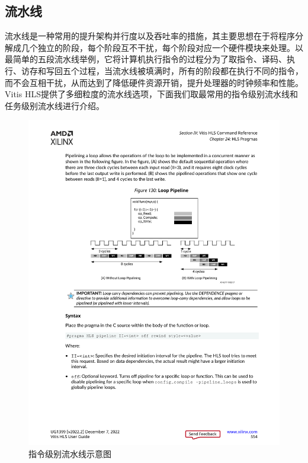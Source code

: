 \subsection{流水线}

流水线是一种常用的提升架构并行度以及吞吐率的措施，其主要思想在于将程序分解成几个独立的阶段，每个阶段互不干扰，每个阶段对应一个硬件模块来处理。以最简单的五段流水线举例，它将计算机执行指令的过程分为了取指令、译码、执行、访存和写回五个过程，当流水线被填满时，所有的阶段都在执行不同的指令，而不会互相干扰，从而达到了降低硬件资源开销，提升处理器的时钟频率和性能。Vitis HLS提供了多细粒度的流水线选项，下面我们取最常用的指令级别流水线和任务级别流水线进行介绍。


\begin{figure}[htbp]
    \centering
    \includegraphics[width=\linewidth]{figures/pragma_pipeline.pdf}
    \caption{指令级别流水线示意图}
    \label{fig:pragma_pipeline}
\end{figure}
